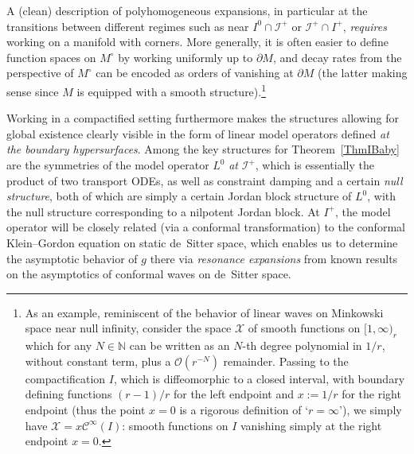 \documentclass[reqno,11pt,letterpaper]{amsart}
\numberwithin{equation}{section}
\numberwithin{figure}{section}
\theoremstyle{definition}
\theoremstyle{remark}
\newcommand{\mc}{\mathcal}
\newcommand{\cC}{\mc C}
\newcommand{\cO}{\mc O}
\newcommand{\cX}{\mc X}
\newcommand{\ms}{\mathscr}
\newcommand{\scri}{\ms I}
\newcommand{\N}{\mathbb{N}}
\newcommand{\pa}{\partial}
\newcommand{\CI}{\cC^\infty}
\begin{document}
A (clean) description of polyhomogeneous expansions, in particular at the transitions between different regimes such as near $I^0\cap\scri^+$ or $\scri^+\cap I^+$, \emph{requires} working on a manifold with corners. More generally, it is often easier to define function spaces on $M^\circ$ by working uniformly up to $\pa M$, and decay rates from the perspective of $M^\circ$ can be encoded as orders of vanishing at $\pa M$ (the latter making sense since $M$ is equipped with a smooth structure).\footnote{As an example, reminiscent of the behavior of linear waves on Minkowski space near null infinity, consider the space $\cX$ of smooth functions on $[1,\infty)_r$ which for any $N\in\N$ can be written as an $N$-th degree polynomial in $1/r$, without constant term, plus a $\cO(r^{-N})$ remainder. Passing to the compactification $I$, which is diffeomorphic to a closed interval, with boundary defining functions $(r-1)/r$ for the left endpoint and $x:=1/r$ for the right endpoint (thus the point $x=0$ is a rigorous definition of `$r=\infty$'), we simply have $\cX=x\CI(I)$: smooth functions on $I$ vanishing simply at the right endpoint $x=0$.}

Working in a compactified setting furthermore makes the structures allowing for global existence clearly visible in the form of linear model operators defined \emph{at the boundary hypersurfaces}. Among the key structures for Theorem~\ref{ThmIBaby} are the symmetries of the model operator $L^0$ \emph{at} $\scri^+$, which is essentially the product of two transport ODEs, as well as constraint damping and a certain \emph{null structure}, both of which are simply a certain Jordan block structure of $L^0$, with the null structure corresponding to a nilpotent Jordan block. At $I^+$, the model operator will be closely related (via a conformal transformation) to the conformal Klein--Gordon equation on static de~Sitter space, which enables us to determine the asymptotic behavior of $g$ there via \emph{resonance expansions} from known results on the asymptotics of conformal waves on de~Sitter space.
\end{document}
